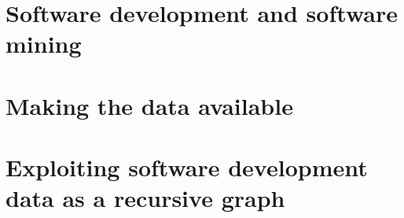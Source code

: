 \documentclass[a4paper,11pt,openbib]{memoir}
\begin{document}
\raggedbottom

\frontmatter
%

\clearemptydoublepage

%

\clearemptydoublepage
%

\clearemptydoublepage


\renewcommand{\contentsname}{Table of Contents}
\tableofcontents*
{}
%


\clearemptydoublepage

\iffalse
\listoftables
\addtocontents{lot}{\par\nobreak\textbf{{\scshape Table} \hfill Page}\par\nobreak}
\clearemptydoublepage
\listoffigures
\addtocontents{lof}{\par\nobreak\textbf{{\scshape Figure} \hfill Page}\par\nobreak}
\clearemptydoublepage
\fi
%
%
\mainmatter
%
\glsresetall


\part{Software development and software mining}







\part{Making the data available}





\part{Exploiting software development data as a recursive graph}
\end{document}
